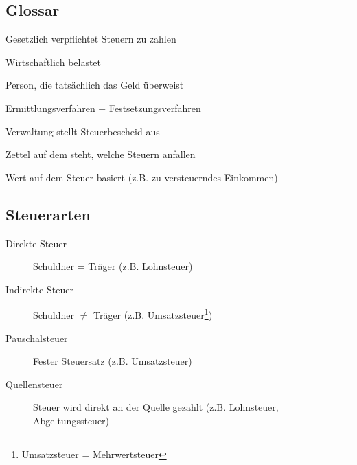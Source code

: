 \documentclass{beamer}
\begin{document}
		\subsection{Glossar}
	
			\begin{frame}
				\begin{description}[Steuerfestsetzung]
					\item[Steuerschuldner] Gesetzlich verpflichtet Steuern zu zahlen
					\item[Steuerträger] Wirtschaftlich belastet
					\item[Steuerzahler] Person, die tatsächlich das Geld überweist
					\item[Veranlagung] Ermittlungsverfahren + Festsetzungsverfahren
					\item[Steuerfestsetzung] Verwaltung stellt Steuerbescheid aus
					\item[Steuerbescheid] Zettel auf dem steht, welche Steuern anfallen
					\item[Bemessungsgrundlage] Wert auf dem Steuer basiert (z.B. zu versteuerndes Einkommen)
				\end{description}
			\end{frame}
	
		\subsection{Steuerarten}
		
			\begin{frame}
				\begin{description}
					\item[Direkte Steuer] Schuldner = Träger (z.B. Lohnsteuer)
					\item[Indirekte Steuer] Schuldner $\neq$ Träger (z.B. Umsatzsteuer\footnote{Umsatzsteuer = Mehrwertsteuer})
					\item[Pauschalsteuer] Fester Steuersatz (z.B. Umsatzsteuer)
					\item[Quellensteuer] Steuer wird direkt an der Quelle gezahlt (z.B. Lohnsteuer, Abgeltungssteuer)
				\end{description}
			\end{frame}
	
\end{document}
